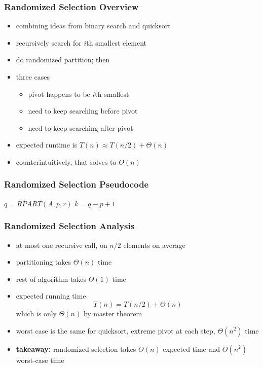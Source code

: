 \documentclass{beamer}
\begin{document}
\begin{frame} \frametitle{Randomized Selection Overview}
\begin{itemize}
  \item combining ideas from binary search and quicksort
  \item recursively search for $i$th smallest element
  \item do randomized partition; then
  \item three cases
    \begin{itemize}
      \item pivot happens to be $i$th smallest
      \item need to keep searching before pivot
      \item need to keep searching after pivot
    \end{itemize}
  \item expected runtime is $T(n) \approx T(n/2) + \Theta(n)$
  \item counterintuitively, that solves to $\Theta(n)$
  \end{itemize}
\end{frame}

\begin{frame} \frametitle{Randomized Selection Pseudocode}
  \begin{algorithmic}[1]
      \State {} 
    \EndIf
    \State $q = RPART(A, p, r)$ 
    \State $k = q - p + 1$ 
      \State {} 
      \State {}
    \Else
      \State {} 
    \EndIf
    \EndFunction
  \end{algorithmic}
\end{frame}

\begin{frame} \frametitle{Randomized Selection Analysis}
\begin{itemize}
  \item at most one recursive call, on $n/2$ elements on average
  \item partitioning takes $\Theta(n)$ time
  \item rest of algorithm takes $\Theta(1)$ time
  \item expected running time
    \[ T(n) = T(n/2) + \Theta(n) \]
    which is only $\Theta(n)$ by master theorem
  \item worst case is the same for quicksort, extreme pivot at each step,
    $\Theta(n^2)$ time
  \item \textbf{takeaway:} randomized selection takes $\Theta(n)$ expected time
    and $\Theta(n^2)$ worst-case time
  \end{itemize}
\end{frame}
\end{document}
